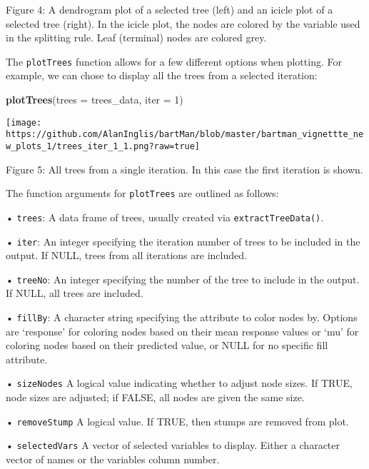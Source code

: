 \documentclass[
]{article}
\newenvironment{Shaded}{\begin{snugshade}}{\end{snugshade}}
\newcommand{\AttributeTok}[1]{\textcolor[rgb]{0.13,0.29,0.53}{#1}}
\newcommand{\DecValTok}[1]{\textcolor[rgb]{0.00,0.00,0.81}{#1}}
\newcommand{\FunctionTok}[1]{\textcolor[rgb]{0.13,0.29,0.53}{\textbf{#1}}}
\newcommand{\NormalTok}[1]{#1}
\begin{document}
\protect\hypertarget{fig4:fig4}{}{Figure 4: }A dendrogram plot of a
selected tree (left) and an icicle plot of a selected tree (right). In
the icicle plot, the nodes are colored by the variable used in the
splitting rule. Leaf (terminal) nodes are colored grey.

The \texttt{plotTrees} function allows for a few different options when
plotting. For example, we can chose to display all the trees from a
selected iteration:

\begin{Shaded}
\begin{Highlighting}[]
\FunctionTok{plotTrees}\NormalTok{(}\AttributeTok{trees =}\NormalTok{ trees\_data, }\AttributeTok{iter =} \DecValTok{1}\NormalTok{)}
\end{Highlighting}
\end{Shaded}

\begin{center}\texttt{[image: https://github.com/AlanInglis/bartMan/blob/master/bartman\_vignettte\_new\_plots\_1/trees\_iter\_1\_1.png?raw=true]} \end{center}

\protect\hypertarget{fig5:fig5}{}{Figure 5: }All trees from a single
iteration. In this case the first iteration is shown.

The function arguments for \texttt{plotTrees} are outlined as follows:

• \texttt{trees}: A data frame of trees, usually created via
\texttt{extractTreeData()}.

• \texttt{iter}: An integer specifying the iteration number of trees to
be included in the output. If NULL, trees from all iterations are
included.

• \texttt{treeNo}: An integer specifying the number of the tree to
include in the output. If NULL, all trees are included.

• \texttt{fillBy}: A character string specifying the attribute to color
nodes by. Options are `response' for coloring nodes based on their mean
response values or `mu' for coloring nodes based on their predicted
value, or NULL for no specific fill attribute.

• \texttt{sizeNodes} A logical value indicating whether to adjust node
sizes. If TRUE, node sizes are adjusted; if FALSE, all nodes are given
the same size.

• \texttt{removeStump} A logical value. If TRUE, then stumps are removed
from plot.

• \texttt{selectedVars} A vector of selected variables to display.
Either a character vector of names or the variables column number.
\end{document}
